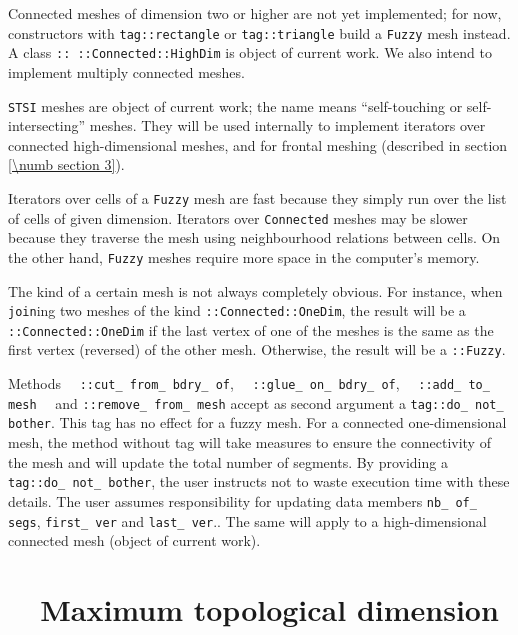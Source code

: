 Connected meshes of dimension two or higher are not yet implemented; for now,
{\small\tt{}} constructors with {\small\tt \textcolor{tag}{tag}::rectangle} or
{\small\tt \textcolor{tag}{tag}::triangle} build a {\small\tt Fuzzy} mesh instead.
A class {\small\tt{}:: ::Connected::HighDim} is object of current work.
We also intend to implement multiply connected meshes.

{\small\tt STSI} meshes are object of current work; the name means
``self-touching or self-intersecting'' meshes.
They will be used internally to implement iterators over connected high-dimensional meshes,
and for frontal meshing (described in section \ref{\numb section 3}).

Iterators over cells of a {\small\tt Fuzzy} mesh are fast because they simply run over the
list of cells of given dimension.
Iterators over {\small\tt Connected} meshes may be slower because they traverse the mesh using
neighbourhood relations between cells.
On the other hand, {\small\tt Fuzzy} meshes require more space in the computer's memory.

The kind of a certain mesh is not always completely obvious.
For instance, when {\small\tt join}ing two meshes of the kind
{\small\tt{}::Connected::OneDim}, the result will be a
{\small\tt{}::Connected::OneDim} if the last vertex of one of the meshes
is the same as the first vertex (reversed) of the other mesh.
Otherwise, the result will be a {\small\tt{}::Fuzzy}.

Methods \ \ {\small\tt{}::cut\_\,from\_\,bdry\_\,of},
\ \ {\small\tt{}::glue\_\,on\_\,bdry\_\,of}, \ \ {\small\tt{}::add\_\,to\_\,mesh}
\ \ and {\small\tt{}::remove\_\,from\_\,mesh}
accept as second argument a {\small\tt\textcolor{tag}{tag}::do\_\,not\_\,bother}.
This tag has no effect for a fuzzy mesh.
For a connected one-dimensional mesh, the method without tag will take measures
to ensure the connectivity of the mesh and will update the total number of segments.
By providing a {\small\tt\textcolor{tag}{tag}::do\_\,not\_\,bother}, the user instructs
{\maniFEM} not to waste execution time with these details.
The user assumes responsibility for updating data members {\small\tt nb\_\,of\_\,segs},
{\small\tt first\_\,ver} and {\small\tt last\_\,ver}..
The same will apply to a high-dimensional connected mesh (object of current work).


\section{~~Maximum topological dimension}\label{\numb section 11.\numb parag 7}

